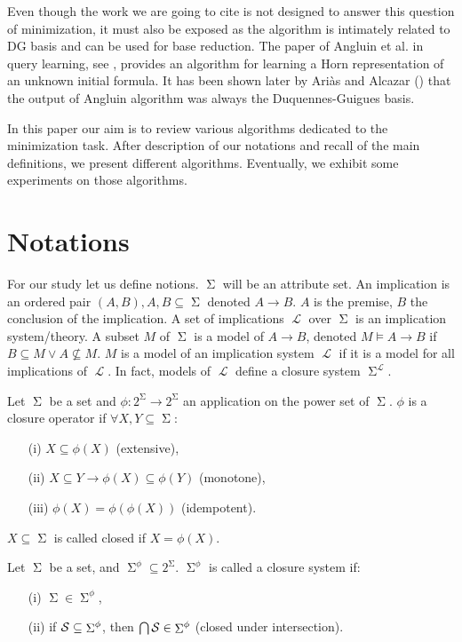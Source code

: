 \documentclass[runningheads]{llncs}
\DeclareMathOperator{\I}{\mathcal{L}}  %
\DeclareMathOperator{\Sg}{\Sigma}  %
\DeclareMathOperator{\imp}{\longrightarrow} %
\begin{document}
Even though the work we are going to cite is not designed to answer this 
question of minimization, it must also be exposed as the algorithm is 
intimately related to DG basis and can be used for base reduction. The paper
of Angluin et al. in query learning, see \cite{angluin_learning_1992}, provides
an algorithm for learning a Horn representation of an unknown initial formula. 
It has been shown later by Ariàs and Alcazar (\cite{arias_canonical_2009}) that
the output of Angluin algorithm was always the Duquennes-Guigues basis.

In this paper our aim is to review various algorithms dedicated to the minimization task. After description of our notations and recall of the main definitions, we present different algorithms. Eventually, we exhibit some experiments on those algorithms.

\section{Notations}

For our study let us define notions. $\Sg$ will be an attribute set. An implication is an ordered pair $(A, B), A, B \subseteq \Sg$ denoted $A \imp B$.
$A$ is the premise, $B$ the conclusion of the implication. A set of implications
$\I$ over $\Sg$ is an implication system/theory. A subset $M$ of $\Sg$ is a model of $A \imp B$, denoted $M \models A \imp B$ if $B \subseteq M \lor A \nsubseteq M$. $M$ is a model of an implication system $\I$ if it is a model for
all implications of $\I$. In fact, models of $\I$ define a closure system $\Sg^{\I}$. 

\begin{definition} Let $\Sg$ be a set and $\phi : 
	2^{\Sg} \imp 2^{\Sg}$ an application on the power set of $\Sg$. $\phi$ is
	a closure operator if $\forall X, Y \subseteq \Sg$:
	\begin{itemize}
		\item[(i)] $X \subseteq \phi(X)$ (extensive),
		\item[(ii)] $X \subseteq Y \imp \phi(X) \subseteq \phi(Y)$
		(monotone),
		\item[(iii)] $\phi(X) = \phi(\phi(X))$ (idempotent).
	\end{itemize}
	$X \subseteq \Sg$ is called closed if $X = \phi(X)$.
\end{definition}

\begin{definition} Let $\Sg$ be a set, and $\Sg^{\phi}
	\subseteq 2^{\Sg}$. $\Sg^{\phi}$ is called a closure system if:
	\begin{itemize}
		\item[(i)] $\Sg \in \Sg^{\phi}$,
		\item[(ii)] if $\cal{S} \subseteq \Sg^{\phi}$, then $\bigcap \cal{S} 
		\in \Sg^{\phi}$ \quad (closed under intersection).
	\end{itemize}
	
\end{definition}
\end{document}
